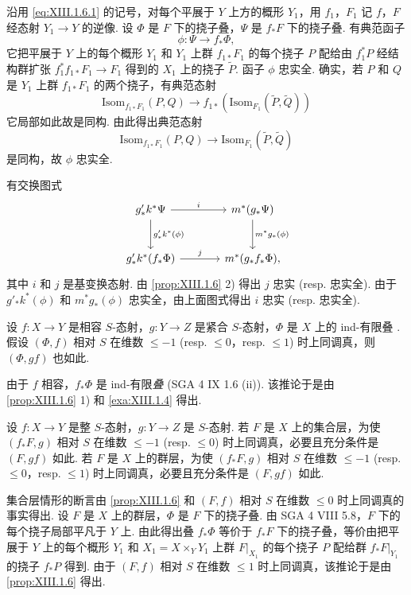 沿用 \eqref{eq:XIII.1.6.1} 的记号，对每个平展于 $Y$ 上方的概形 $Y_1$，用 $f_1$，$F_1$ 记 $f$，$F$ 经态射 $Y_1 \to Y$ 的逆像. 设 $\Phi$ 是 $F$ 下的挠子叠，$\Psi$ 是 $f_* F$ 下的挠子叠. 有典范函子
\[
\phi \colon \Psi \longrightarrow f_* \Phi,
\]
它把平展于 $Y$ 上的每个概形 $Y_1$ 和 $Y_1$ 上群 $f_{1*} F_1$ 的每个挠子 $P$ 配给由 $f_1^{*} P$ 经结构群扩张 $f_1^{*} f_{1*} F_1 \to F_1$ 得到的 $X_1$ 上的挠子 $\widetilde{P}$. 函子 $\phi$ 忠实全. 确实，若 $P$ 和 $Q$ 是 $Y_1$ 上群 $f_{1*} F_1$ 的两个挠子，有典范态射
\[
\mathrm{Isom}_{f_{1*} F_1}(P, Q) \longrightarrow f_{1*}(\mathrm{Isom}_{F_1}(\widetilde{P}, \widetilde{Q}))
\]
它局部如此故是同构. 由此得出典范态射
\[
\mathrm{Isom}_{f_{1*} F_1}(P, Q) \longrightarrow \mathrm{Isom}_{F_1}(\widetilde{P}, \widetilde{Q})
\]
是同构，故 $\phi$ 忠实全.

有交换图式
\[
\begin{tikzcd}[row sep=large, column sep=large]
g'_* k^{*} \Psi \arrow[r,"{i}"] \arrow[d,"{g'_* k^{*}(\phi)}"] & m^{*}(g_* \Psi) \arrow[d,"{m^{*} g_*(\phi)}"] \\
g'_* k^{*}(f_* \Phi) \arrow[r,"{j}"] & m^{*}(g_* f_* \Phi),
\end{tikzcd}
\]
其中 $i$ 和 $j$ 是基变换态射. 由 \ref{prop:XIII.1.6} 2) 得出 $j$ 忠实 (resp. 忠实全). 由于 $g'_* k^{*}(\phi)$ 和 $m^{*} g_*(\phi)$ 忠实全，由上面图式得出 $i$ 忠实 (resp. 忠实全).

\begin{corollary}\label{cor:XIII.1.8}
设 $f \colon X \to Y$ 是相容 $S$-态射，$g \colon Y \to Z$ 是紧合 $S$-态射，$\Phi$ 是 $X$ 上的 ind-有限叠 \cite[VII 2.2.1]{exp13-2}. 假设 $(\Phi, f)$ 相对 $S$ 在维数 $\leqslant -1$ (resp. $\leqslant 0$，resp. $\leqslant 1$) 时上同调真，则 $(\Phi, gf)$ 也如此.
\end{corollary}

由于 $f$ 相容，$f_* \Phi$ 是 ind-有限\emph{叠} (SGA 4 IX 1.6 (ii)). 该推论于是由 \ref{prop:XIII.1.6} 1) 和 \ref{exa:XIII.1.4} 得出.

\begin{corollary}\label{cor:XIII.1.9}
设 $f \colon X \to Y$ 是整 $S$-态射，$g \colon Y \to Z$ 是 $S$-态射. 若 $F$ 是 $X$ 上的集合层，为使 $(f_* F, g)$ 相对 $S$ 在维数 $\leqslant -1$ (resp. $\leqslant 0$) 时上同调真，必要且充分条件是 $(F, gf)$ 如此. 若 $F$ 是 $X$ 上的群层，为使 $(f_* F, g)$ 相对 $S$ 在维数 $\leqslant -1$ (resp. $\leqslant 0$，resp. $\leqslant 1$) 时上同调真，必要且充分条件是 $(F, gf)$ 如此.
\end{corollary}

集合层情形的断言由 \ref{prop:XIII.1.6} 和 $(F, f)$ 相对 $S$ 在维数 $\leqslant 0$ 时上同调真的事实得出. 设 $F$ 是 $X$ 上的群层，$\Phi$ 是 $F$ 下的挠子叠. 由 SGA 4 VIII 5.8，$F$ 下的每个挠子局部平凡于 $Y$ 上. 由此得出叠 $f_* \Phi$ 等价于 $f_* F$ 下的挠子叠，等价由把平展于 $Y$ 上的每个概形 $Y_1$ 和 $X_1 = X \times_Y Y_1$ 上群 $F|_{X_1}$ 的每个挠子 $P$ 配给群 $f_* F|_{Y_1}$ 的挠子 $f_* P$ 得到. 由于 $(F, f)$ 相对 $S$ 在维数 $\leqslant 1$ 时上同调真，该推论于是由 \ref{prop:XIII.1.6} 得出.

